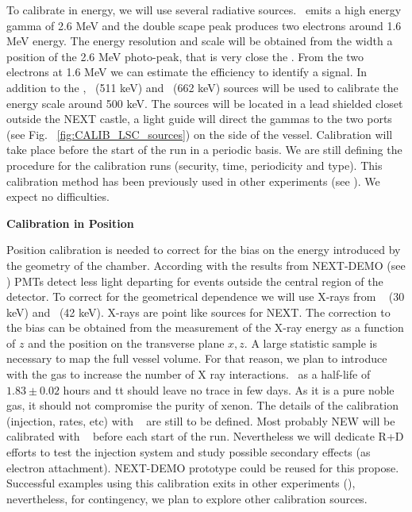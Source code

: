 To calibrate in energy, we will use several radiative sources.
\Tl ~emits a high energy gamma of 2.6 MeV and the double scape peak produces two electrons around 1.6 MeV energy.
The energy resolution and scale will be obtained from the width a position of the 2.6 MeV photo-peak, that is very close the \Qbb. 
From the two electrons at 1.6 MeV we can estimate the efficiency to identify a \bb signal.  
In addition to the \Tl, \NA ~(511 keV) and \CS ~(662 keV)  sources will be used to calibrate the energy scale around 500 keV. 
The sources will be located in a lead shielded closet outside the NEXT castle, a light guide will direct the gammas to the two ports (see Fig. ~\ref{fig:CALIB_LSC_sources}) on the side of the vessel. 
Calibration will take place before the start of the run in a periodic basis.
We are still defining the procedure for the calibration runs (security, time, periodicity and type). This calibration method has been previously used in other \bb experiments (see \cite{COURE-Tl}). We expect no difficulties. 

{\bf Calibration in Position}

Position calibration is needed to correct for the bias on the energy introduced by the geometry of the chamber. According with the results from NEXT-DEMO (see \cite{NEXT-DEMO}) PMTs detect less light departing for events outside the central region of the detector. To correct for the geometrical dependence we will use X-rays from \Xe ~ (30 keV)  and \KR ~(42 keV). X-rays are point like sources for NEXT.
The correction to the bias can be obtained from the measurement of the X-ray energy as a function of $z$ and the position on the transverse plane $x,z$.
A large statistic sample is necessary to map the full vessel volume.
For that reason, we plan to introduce \KR with the \Xe gas to increase the number of X ray interactions.  \KR ~as a half-life of $1.83 \pm 0.02$ hours and
tt should leave no trace in few days. 
As it is a pure noble gas, it should not compromise the purity of xenon.
The details of the calibration (injection, rates, etc) with \KR~ are still to be defined.
Most probably NEW will be calibrated with \KR~ before each start of the run.
Nevertheless we will dedicate R+D efforts to test the injection system and study possible secondary effects (as electron attachment). NEXT-DEMO prototype could be reused for this propose. 
Successful examples using this calibration exits in other experiments (\cite{KR}), nevertheless, for contingency, we plan to explore other calibration sources. 

